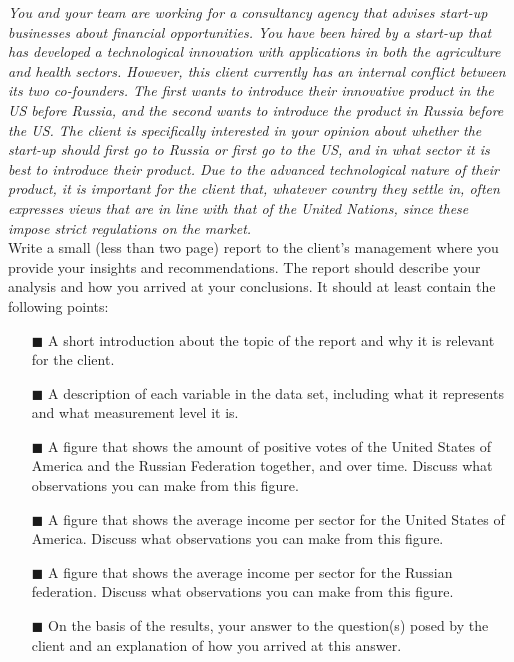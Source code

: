 \textit{You and your team are working for a consultancy agency that advises start-up businesses about financial opportunities. You have been hired by a start-up that has developed a technological innovation with applications in both the agriculture and health sectors. However, this client currently has an internal conflict between its two co-founders. The first wants to introduce their innovative product in the US before Russia, and the second wants to introduce the product in Russia before the US. The client is specifically interested in your opinion about whether the start-up should first go to Russia or first go to the US, and in what sector it is best to introduce their product. Due to the advanced technological nature of their product, it is important for the client that, whatever country they settle in, often expresses views that are in line with that of the United Nations, since these impose strict regulations on the market.} \\

Write a small (less than two page) report to the client's management where you provide your insights and recommendations. The report should describe your analysis and how you arrived at your conclusions. It should at least contain the following points: \\

\begin{itemize}
    \item[$\blacksquare$] A short introduction about the topic of the report and why it is relevant for the client.
    \item[$\blacksquare$] A description of each variable in the  data set, including what it represents and what measurement level it is.
    \item[$\blacksquare$] A figure that shows the amount of positive votes of the United States of America and the Russian Federation together, and over time. Discuss what observations you can make from this figure.
    \item[$\blacksquare$] A figure that shows the average income per sector for the United States of America. Discuss what observations you can make from this figure.
    \item[$\blacksquare$] A figure that shows the average income per sector for the Russian federation. Discuss what observations you can make from this figure.
    \item[$\blacksquare$] On the basis of the results, your answer to the question(s) posed by the client and an explanation of how you arrived at this answer.
\end{itemize}

\clearpage %